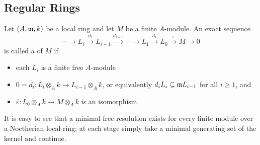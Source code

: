 \subsection{Regular Rings}

\begin{definition}
    Let $(A,\mathfrak{m}, k)$ be a local ring and let $M$ be a finite $A$-module. An exact sequence 
    \begin{equation*}
        \cdots\to L_i\xrightarrow{d_i} L_{i - 1}\xrightarrow{d_{i - 1}}\cdots\to L_1\xrightarrow{d_1} L_0\xrightarrow\varepsilon M\to 0
    \end{equation*}
    is called a  of $M$ if 
    \begin{itemize}
        \item each $L_i$ is a finite free $A$-module
        \item $0 = \overline d_i: L_{i}\otimes_A k\to L_{i - 1}\otimes_A k$, or equivalently $d_i L_i\subseteq\mathfrak{m} L_{i - 1}$ for all $i\ge 1$, and 
        \item $\overline\varepsilon: L_0\otimes_A k\to M\otimes_A k$ is an isomorphism.
    \end{itemize}
\end{definition}

It is easy to see that a minimal free resolution exists for every finite module over a Noetherian local ring; at each stage simply take a minimal generating set of the kernel and continue.

